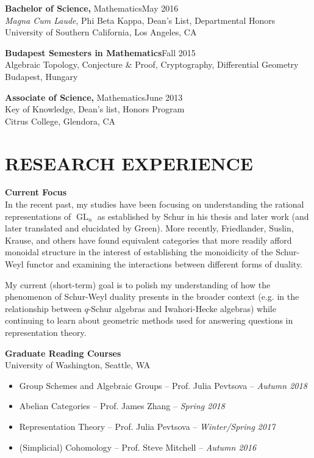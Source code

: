 \documentclass[margin]{res} %
\begin{document}
\begin{resume}
{\bf Bachelor of Science,} Mathematics\hfill May 2016 \\
{\sl Magna Cum Laude}, Phi Beta Kappa, Dean's List, Departmental Honors \\
University of Southern California, Los Angeles, CA 

{\bf Budapest Semesters in Mathematics}\hfill Fall 2015 \\
Algebraic Topology, Conjecture \& Proof, Cryptography, Differential Geometry  \\
Budapest, Hungary 

{\bf Associate of Science,} Mathematics\hfill June 2013\\
Key of Knowledge, Dean's list, Honors Program \\
Citrus College, Glendora, CA 
 

\section{RESEARCH EXPERIENCE}

{\bf Current Focus}\\
In the recent past, my studies have been focusing on understanding the rational representations of $\operatorname{GL}_n$ as established by Schur in his thesis 
and later work (and later translated and elucidated by Green). More recently, Friedlander, Suslin, Krause,
and others have found equivalent categories that more readily afford monoidal structure in the interest of establishing the monoidicity 
of the Schur-Weyl functor and examining the interactions between different forms of duality. 

My current (short-term) goal is to polish my understanding of how the phenomenon of Schur-Weyl duality presents in the broader 
context (e.g. in the relationship between $q$-Schur algebras and Iwahori-Hecke algebras) while continuing to learn about geometric methods 
used for answering questions in representation theory.

{\bf Graduate Reading Courses} \\
University of Washington, Seattle, WA
\begin{itemize} \itemsep -1pt %
	\item Group Schemes and Algebraic Groups -- Prof. Julia Pevtsova -- {\sl Autumn 2018}
	\item Abelian Categories -- Prof. James Zhang -- {\sl Spring 2018}
	\item Representation Theory -- Prof. Julia Pevtsova -- {\sl Winter/Spring 2017}
	\item (Simplicial) Cohomology -- Prof. Steve Mitchell -- {\sl Autumn 2016}
\end{itemize}


\end{resume}
\end{document}
